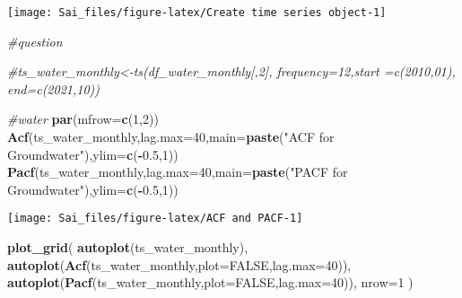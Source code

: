 \documentclass[
]{article}
\newenvironment{Shaded}{\begin{snugshade}}{\end{snugshade}}
\newcommand{\AttributeTok}[1]{\textcolor[rgb]{0.13,0.29,0.53}{#1}}
\newcommand{\CommentTok}[1]{\textcolor[rgb]{0.56,0.35,0.01}{\textit{#1}}}
\newcommand{\ConstantTok}[1]{\textcolor[rgb]{0.56,0.35,0.01}{#1}}
\newcommand{\DecValTok}[1]{\textcolor[rgb]{0.00,0.00,0.81}{#1}}
\newcommand{\FloatTok}[1]{\textcolor[rgb]{0.00,0.00,0.81}{#1}}
\newcommand{\FunctionTok}[1]{\textcolor[rgb]{0.13,0.29,0.53}{\textbf{#1}}}
\newcommand{\NormalTok}[1]{#1}
\newcommand{\SpecialCharTok}[1]{\textcolor[rgb]{0.81,0.36,0.00}{\textbf{#1}}}
\newcommand{\StringTok}[1]{\textcolor[rgb]{0.31,0.60,0.02}{#1}}
\begin{document}
\begin{center}\texttt{[image: Sai\_files/figure-latex/Create time series object-1]} \end{center}

\begin{Shaded}
\begin{Highlighting}[]
\CommentTok{\#question}
\end{Highlighting}
\end{Shaded}

\begin{Shaded}
\begin{Highlighting}[]
\CommentTok{\#ts\_water\_monthly\textless{}{-}ts(df\_water\_monthly[,2], frequency=12,start =c(2010,01), end=c(2021,10))}

\CommentTok{\#water}
\FunctionTok{par}\NormalTok{(}\AttributeTok{mfrow=}\FunctionTok{c}\NormalTok{(}\DecValTok{1}\NormalTok{,}\DecValTok{2}\NormalTok{))}
\FunctionTok{Acf}\NormalTok{(ts\_water\_monthly,}\AttributeTok{lag.max=}\DecValTok{40}\NormalTok{,}\AttributeTok{main=}\FunctionTok{paste}\NormalTok{(}\StringTok{"ACF for Groundwater"}\NormalTok{),}\AttributeTok{ylim=}\FunctionTok{c}\NormalTok{(}\SpecialCharTok{{-}}\FloatTok{0.5}\NormalTok{,}\DecValTok{1}\NormalTok{)) }
\FunctionTok{Pacf}\NormalTok{(ts\_water\_monthly,}\AttributeTok{lag.max=}\DecValTok{40}\NormalTok{,}\AttributeTok{main=}\FunctionTok{paste}\NormalTok{(}\StringTok{"PACF for Groundwater"}\NormalTok{),}\AttributeTok{ylim=}\FunctionTok{c}\NormalTok{(}\SpecialCharTok{{-}}\FloatTok{0.5}\NormalTok{,}\DecValTok{1}\NormalTok{))}
\end{Highlighting}
\end{Shaded}

\begin{center}\texttt{[image: Sai\_files/figure-latex/ACF and PACF-1]} \end{center}

\begin{Shaded}
\begin{Highlighting}[]
\FunctionTok{plot\_grid}\NormalTok{(}
  \FunctionTok{autoplot}\NormalTok{(ts\_water\_monthly),}
  \FunctionTok{autoplot}\NormalTok{(}\FunctionTok{Acf}\NormalTok{(ts\_water\_monthly,}\AttributeTok{plot=}\ConstantTok{FALSE}\NormalTok{,}\AttributeTok{lag.max=}\DecValTok{40}\NormalTok{)),}
  \FunctionTok{autoplot}\NormalTok{(}\FunctionTok{Pacf}\NormalTok{(ts\_water\_monthly,}\AttributeTok{plot=}\ConstantTok{FALSE}\NormalTok{,}\AttributeTok{lag.max=}\DecValTok{40}\NormalTok{)),}
  \AttributeTok{nrow=}\DecValTok{1}
\NormalTok{)}
\end{Highlighting}
\end{Shaded}
\end{document}
